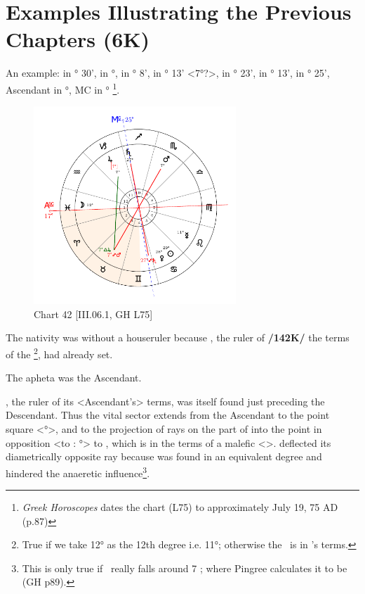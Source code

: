 \section{Examples Illustrating the Previous Chapters (6K)}

An example: \Sun\xspace in \Cancer\xspace 29° 30', \Moon\xspace in \Pisces\xspace 12°, \Saturn\xspace in \Sagittarius\xspace 27° 8', \Jupiter\xspace in \Capricorn\xspace 22° 13' <7°?>, \Mars\xspace in \Scorpio\xspace 7° 23', \Venus\xspace in \Cancer\xspace 28° 13', \Mercury\xspace in \Leo\xspace 11° 25',
Ascendant in \Pisces\xspace 17°, MC in \Sagittarius\xspace 25°
\footnote{\textit{Greek Horoscopes} dates the chart (L75) to approximately July 19, 75 AD (p.87)}. 

\clearpage
\begin{figure}
\centering
\vspace{-20pt}
\includegraphics[width=0.68\textwidth]{charts/3_06_1}
\caption{Chart 42 [III.06.1, GH L75]}
\label{fig:chart42}
\end{figure} 

\noindent The nativity was without a houseruler because \Venus,
the ruler of \textbf{/142K/} the terms of the \Moon\footnote{True if we take 12° as the 12th degree i.e. 11°; otherwise the \Moon\, is in \Jupiter's terms.}, had already set. 

The apheta was the Ascendant. 

\noindent \Mercury, the ruler of its <Ascendant’s> terms, was itself found just preceding the Descendant. Thus the vital sector
extends from the Ascendant to the point square <\Gemini\xspace 17°>, and to the projection of rays on the part of \Saturn\xspace into the point in opposition <to \Saturn: °> to \Saturn, which is in the terms of a malefic <\Saturn>. \Mars\xspace deflected its diametrically opposite ray because \Jupiter\xspace was found in an equivalent degree and hindered the anaeretic influence\footnote{This is only true if \Jupiter\, really falls around 7 \Capricorn; where Pingree calculates it to be (GH p89).}. 

